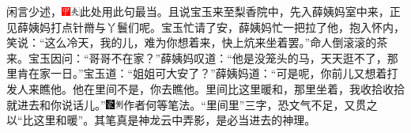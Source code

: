 闲言少述，{\includegraphics[width=3mm]{../Images/00002}\includegraphics[width=3mm]{../Images/00012}\footnotesize \kaishu 此处用此句最当。}且说宝玉来至梨香院中，先入薛姨妈室中来，正见薛姨妈打点针黹与丫鬟们呢。宝玉忙请了安，薛姨妈忙一把拉了他，抱入怀内，笑说：“这么冷天，我的儿，难为你想着来，快上炕来坐着罢。”命人倒滚滚的茶来。宝玉因问：“哥哥不在家？”薛姨妈叹道：“他是没笼头的马，天天逛不了，那里肯在家一日。”宝玉道：“姐姐可大安了？”薛姨妈道：“可是呢，你前儿又想着打发人来瞧他。他在里间不是，你去瞧他。里间比这里暖和，那里坐着，我收拾收拾就进去和你说话儿。”{\includegraphics[width=3mm]{../Images/00006}\includegraphics[width=3mm]{../Images/00011}\footnotesize \kaishu 作者何等笔法。“里间里”三字，恐文气不足，又贯之以“比这里和暖”。其笔真是神龙云中弄影，是必当进去的神理。}

